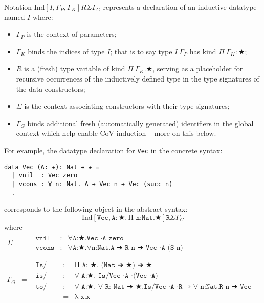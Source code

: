 \documentclass{article}
\newcommand{\ann}[2]{#1\! : \! #2}
\newcommand{\indsche}[3]{\ensuremath{\text{Ind}[#1,#2,#3]}}
\begin{document}
Notation $\indsche{I}{\Gamma_P}{\Gamma_K}{R}{\Sigma}{\Gamma_G}$ represents a declaration of
an inductive datatype named $I$ where:
\begin{itemize}
\item $\Gamma_P$ is the context of parameters;
\item $\Gamma_K$ binds the indices of type $I$; that is to say type $I\ \Gamma_P$ has kind
  $Π\ \Gamma_K: ★$;
\item $R$ is a (fresh) type variable of kind $Π\ \Gamma_K. ★$, serving as a placeholder for
  recursive occurrences of the inductively defined type in the type signatures
  of the data constructors;
\item $\Sigma$ is the context associating constructors with their type
  signatures;
\item $\Gamma_G$ binds additional fresh (automatically generated) identifiers in
  the global context which help enable CoV induction -- more on this below.
\end{itemize}

For example, the datatype declaration for \texttt{Vec} in the concrete syntax:
\begin{verbatim}
data Vec (A: ★): Nat ➔ ★ =
  | vnil  : Vec zero
  | vcons : ∀ n: Nat. A ➔ Vec n ➔ Vec (succ n)
  .
\end{verbatim}

corresponds to the following object in the abstract syntax:
\[
  \indsche{\texttt{Vec}}{\ann{\texttt{A}}{★}}{\texttt{Π n:Nat.★}}{\texttt{R}}{\Sigma}{\Gamma_G}
\]
\noindent where
\[
  \begin{array}{lcl}
    \Sigma
    & =
    & \begin{array}{lcl}
        \texttt{vnil} & : & \texttt{∀A:★.Vec ·A zero}
        \\ \texttt{vcons} & : & \texttt{∀A:★.∀n:Nat.A ➔ R n ➔ Vec ·A (S n)}
      \end{array}
    \\ \\ \Gamma_G
    & =
    & \begin{array}{lcl}
        \texttt{Is/Vec} & : & \texttt{Π A: ★. (Nat ➔ ★) ➔ ★}
        \\ \texttt{is/Vec} & : & \texttt{∀ A:★. Is/Vec ·A ·(Vec ·A)}
        \\ \texttt{to/Vec} & : & \texttt{∀ A:★. ∀ R: Nat ➔ ★.Is/Vec ·A ·R ➾ ∀ n:Nat.R n ➔ Vec ·A n}
        \\                 & = & \texttt{λ x.x}
      \end{array}
  \end{array}
\]
\end{document}
